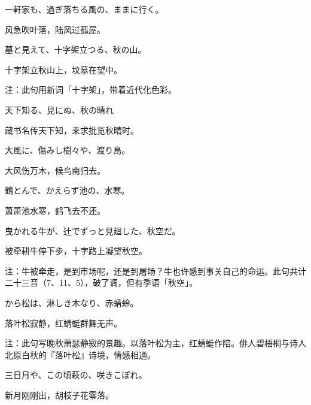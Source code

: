 \begin{haiku}
    {\FH 一軒家も、過ぎ落ちる風の、ままに行く。}

    {\FK 风急吹叶落，陆风过孤屋。}
\end{haiku}

\begin{haiku}
    {\FH 墓と見えて、十字架立つる、秋の山。}

    {\FK 十字架立秋山上，坟墓在望中。}

    {\FT 注：此句用新词「十字架」，带着近代化色彩。}
\end{haiku}

\begin{haiku}
    {\FH 天下知る、見にぬ、秋の晴れ}

    {\FK 藏书名传天下知，来求批览秋晴时。}
\end{haiku}

\begin{haiku}
    {\FH 大風に、傷みし樹々や、渡り鳥。}

    {\FK 大风伤万木，候鸟南归去。}
\end{haiku}

\begin{haiku}
    {\FH 鶴とんで、かえらず池の、水寒。}

    {\FK 萧萧池水寒，鹤飞去不还。}
\end{haiku}

\begin{haiku}
    {\FH 曳かれる牛が、辻でずっと見廻した、秋空だ。}

    {\FK 被牵耕牛停下步，十字路上凝望秋空。}

    {\FT 注：牛被牵走，是到市场呢，还是到屠场？牛也许感到事关自己的命运。此句共计二十三音（7、11、5），破了调，但有季语「秋空」。}
\end{haiku}

\begin{haiku}
    {\FH から松は、淋しき木なり、赤蜻蛉。}

    {\FK 落叶松寂静，红蜻蜓群舞无声。}

    {\FT 注：此句写晚秋萧瑟静寂的景趣。以落叶松为主，红蜻蜓作陪。俳人碧梧桐与诗人北原白秋的『落叶松』诗境，情感相通。}
\end{haiku}

\begin{haiku}
    {\FH 三日月や、この頃萩の、咲きこぼれ。}

    {\FK 新月刚刚出，胡枝子花零落。}
\end{haiku}

